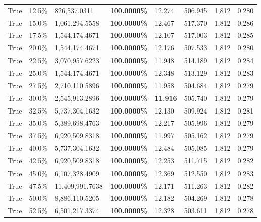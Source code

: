 \begin{table}[H]
\begin{tabular}{lllrllll}
\cline{1-8}
True & 12.5\% & 826,537.0311 & \bfseries \color{red} 100.0000\% & 12.274 & 506.945 & 1,812 & 0.280 \\
\cline{1-8}
True & 15.0\% & 1,061,294.5558 & \bfseries \color{red} 100.0000\% & 12.467 & 517.370 & 1,812 & 0.286 \\
\cline{1-8}
True & 17.5\% & 1,544,174.4671 & \bfseries \color{red} 100.0000\% & 12.107 & 517.003 & 1,812 & 0.285 \\
\cline{1-8}
True & 20.0\% & 1,544,174.4671 & \bfseries \color{red} 100.0000\% & 12.176 & 507.533 & 1,812 & 0.280 \\
\cline{1-8}
True & 22.5\% & 3,070,957.6223 & \bfseries \color{red} 100.0000\% & 11.948 & 514.189 & 1,812 & 0.284 \\
\cline{1-8}
True & 25.0\% & 1,544,174.4671 & \bfseries \color{red} 100.0000\% & 12.348 & 513.129 & 1,812 & 0.283 \\
\cline{1-8}
True & 27.5\% & 2,710,110.5896 & \bfseries \color{red} 100.0000\% & 11.958 & 504.684 & 1,812 & 0.279 \\
\cline{1-8}
True & 30.0\% & 2,545,913.2896 & \bfseries \color{red} 100.0000\% & \bfseries \color{red} 11.916 & 505.740 & 1,812 & 0.279 \\
\cline{1-8}
True & 32.5\% & 5,737,304.1632 & \bfseries \color{red} 100.0000\% & 12.130 & 509.924 & 1,812 & 0.281 \\
\cline{1-8}
True & 35.0\% & 5,389,698.4763 & \bfseries \color{red} 100.0000\% & 12.217 & 505.996 & 1,812 & 0.279 \\
\cline{1-8}
True & 37.5\% & 6,920,509.8318 & \bfseries \color{red} 100.0000\% & 11.997 & 505.162 & 1,812 & 0.279 \\
\cline{1-8}
True & 40.0\% & 5,737,304.1632 & \bfseries \color{red} 100.0000\% & 12.484 & 505.085 & 1,812 & 0.279 \\
\cline{1-8}
True & 42.5\% & 6,920,509.8318 & \bfseries \color{red} 100.0000\% & 12.253 & 511.715 & 1,812 & 0.282 \\
\cline{1-8}
True & 45.0\% & 6,107,328.4909 & \bfseries \color{red} 100.0000\% & 12.369 & 512.550 & 1,812 & 0.283 \\
\cline{1-8}
True & 47.5\% & 11,409,991.7638 & \bfseries \color{red} 100.0000\% & 12.171 & 511.263 & 1,812 & 0.282 \\
\cline{1-8}
True & 50.0\% & 8,886,110.5205 & \bfseries \color{red} 100.0000\% & 12.182 & 504.269 & 1,812 & 0.278 \\
\cline{1-8}
True & 52.5\% & 6,501,217.3374 & \bfseries \color{red} 100.0000\% & 12.328 & 503.611 & 1,812 & 0.278 \\

\end{tabular}
\end{table}
